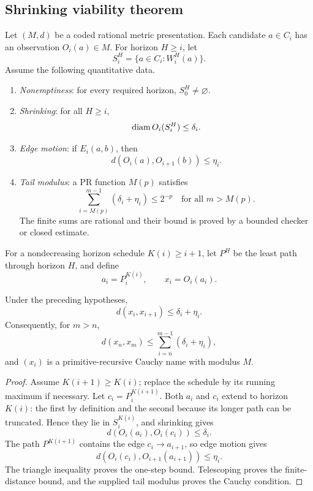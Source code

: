 \subsection{Shrinking viability theorem}

Let \((M,d)\) be a coded rational metric presentation.  Each candidate
\(a\in C_i\) has an observation \(O_i(a)\in M\).  For horizon \(H\geq i\), let
\[
 S_i^H=\{a\in C_i:W_i^H(a)\}.
\]
Assume the following quantitative data.

\begin{enumerate}
\item \emph{Nonemptiness}: for every required horizon, \(S_0^H\neq\varnothing\).
\item \emph{Shrinking}: for all \(H\geq i\),
\[
 \operatorname{diam} O_i(S_i^H)\leq\delta_i.
\]
\item \emph{Edge motion}: if \(E_i(a,b)\), then
\[
 d(O_i(a),O_{i+1}(b))\leq\eta_i.
\]
\item \emph{Tail modulus}: a PR function \(M(p)\) satisfies
\[
 \sum_{i=M(p)}^{m-1}(\delta_i+\eta_i)\leq 2^{-p}
 \quad\text{for all }m>M(p).
\]
The finite sums are rational and their bound is proved by a bounded checker or
closed estimate.
\end{enumerate}

For a nondecreasing horizon schedule \(K(i)\geq i+1\), let \(P^H\) be the
least path through horizon \(H\), and define
\[
 a_i=P^{K(i)}_i,\qquad x_i=O_i(a_i).
\]

\begin{theorem}
\label{thm:shrinking-viability}
Under the preceding hypotheses,
\[
 d(x_i,x_{i+1})\leq\delta_i+\eta_i.
\]
Consequently, for \(m>n\),
\[
 d(x_n,x_m)\leq\sum_{i=n}^{m-1}(\delta_i+\eta_i),
\]
and \((x_i)\) is a primitive-recursive Cauchy name with modulus \(M\).
\end{theorem}

\begin{proof}
Assume \(K(i+1)\geq K(i)\); replace the schedule by its running maximum if
necessary.  Let \(c_i=P^{K(i+1)}_i\).  Both \(a_i\) and \(c_i\) extend to
horizon \(K(i)\): the first by definition and the second because its longer
path can be truncated.  Hence they lie in \(S_i^{K(i)}\), and shrinking gives
\[
 d(O_i(a_i),O_i(c_i))\leq\delta_i.
\]
The path \(P^{K(i+1)}\) contains the edge
\(c_i\to a_{i+1}\), so edge motion gives
\[
 d(O_i(c_i),O_{i+1}(a_{i+1}))\leq\eta_i.
\]
The triangle inequality proves the one-step bound.  Telescoping proves the
finite-distance bound, and the supplied tail modulus proves the Cauchy
condition.
\end{proof}


